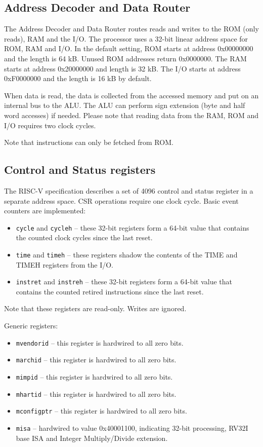 \documentclass[12pt]{article}
\begin{document}
\subsection{Address Decoder and Data Router}
\label{sec:addressdecoderanddatarouter}
The Address Decoder and Data Router routes reads and writes to the ROM (only reads), RAM and the I/O. The processor uses a 32-bit linear address space for ROM, RAM and I/O. In the default setting, ROM starts at address 0x00000000 and the length is 64 kB. Unused ROM addresses return 0x0000000. The RAM starts at address 0x20000000 and length is 32 kB. The I/O starts at address 0xF0000000 and the length is 16 kB by default.

When data is read, the data is collected from the accessed memory and put on an internal bus to the ALU. The ALU can perform sign extension (byte and half word accesses) if needed. Please note that reading data from the RAM, ROM and I/O requires two clock cycles.

Note that instructions can only be fetched from ROM.

\subsection{Control and Status registers}
The RISC-V specification describes a set of 4096 control and status register in a separate address space. CSR operations require one clock cycle. Basic event counters are implemented:

\begin{itemize}
\item \texttt{cycle} and \texttt{cycleh} -- these 32-bit registers form a 64-bit value that contains the counted clock cycles since the last reset.
\item \texttt{time} and \texttt{timeh} -- these registers shadow the contents of the TIME and TIMEH registers from the I/O.
\item \texttt{instret} and \texttt{instreh} -- these 32-bit registers form a 64-bit value that contains the counted retired instructions since the last reset.
\end{itemize}

Note that these registers are read-only. Writes are ignored. 

Generic registers:

\begin{itemize}
\item \texttt{mvendorid} -- this register is hardwired to all zero bits.
\item \texttt{marchid} -- this register is hardwired to all zero bits.
\item \texttt{mimpid} -- this register is hardwired to all zero bits.
\item \texttt{mhartid} -- this register is hardwired to all zero bits.
\item \texttt{mconfigptr} -- this register is hardwired to all zero bits.
\item \texttt{misa} -- hardwired to value 0x40001100, indicating 32-bit processing, RV32I base ISA and Integer Multiply/Divide extension.
\end{itemize}
\end{document}
